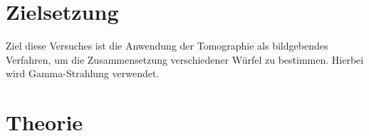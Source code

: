 \section{Zielsetzung}
\label{sec:Zielsetzung}
Ziel diese Versuches ist die Anwendung der Tomographie als bildgebendes Verfahren, um die Zusammensetzung verschiedener Würfel zu bestimmen.
Hierbei wird Gamma-Strahlung verwendet.

\section{Theorie}
\label{sec:Theorie}


